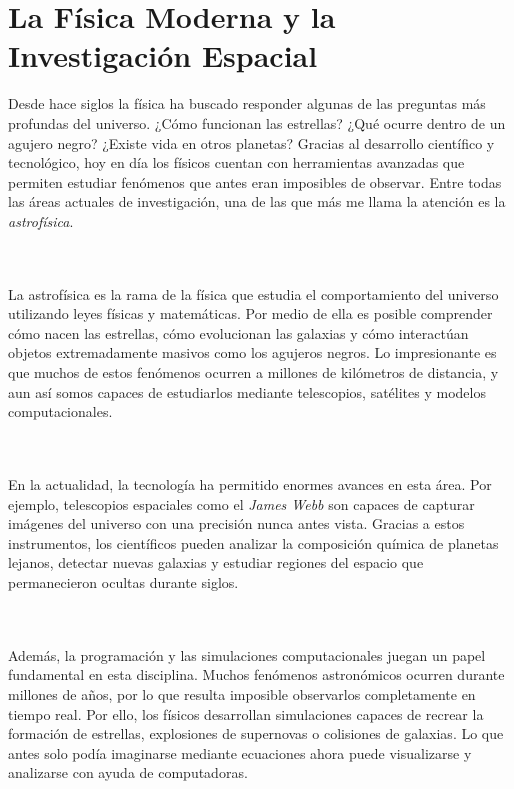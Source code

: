 \documentclass[12pt]{article}
\begin{document}
\section{La Física Moderna y la Investigación Espacial}

Desde hace siglos la física ha buscado responder algunas de las preguntas más profundas del universo. ¿Cómo funcionan las estrellas? ¿Qué ocurre dentro de un agujero negro? ¿Existe vida en otros planetas? Gracias al desarrollo científico y tecnológico, hoy en día los físicos cuentan con herramientas avanzadas que permiten estudiar fenómenos que antes eran imposibles de observar. Entre todas las áreas actuales de investigación, una de las que más me llama la atención es la \textit{astrofísica}.

\\ \\

La astrofísica es la rama de la física que estudia el comportamiento del universo utilizando leyes físicas y matemáticas. Por medio de ella es posible comprender cómo nacen las estrellas, cómo evolucionan las galaxias y cómo interactúan objetos extremadamente masivos como los agujeros negros. Lo impresionante es que muchos de estos fenómenos ocurren a millones de kilómetros de distancia, y aun así somos capaces de estudiarlos mediante telescopios, satélites y modelos computacionales.

\\ \\

En la actualidad, la tecnología ha permitido enormes avances en esta área. Por ejemplo, telescopios espaciales como el \textit{James Webb} son capaces de capturar imágenes del universo con una precisión nunca antes vista. Gracias a estos instrumentos, los científicos pueden analizar la composición química de planetas lejanos, detectar nuevas galaxias y estudiar regiones del espacio que permanecieron ocultas durante siglos.

\\ \\

Además, la programación y las simulaciones computacionales juegan un papel fundamental en esta disciplina. Muchos fenómenos astronómicos ocurren durante millones de años, por lo que resulta imposible observarlos completamente en tiempo real. Por ello, los físicos desarrollan simulaciones capaces de recrear la formación de estrellas, explosiones de supernovas o colisiones de galaxias. Lo que antes solo podía imaginarse mediante ecuaciones ahora puede visualizarse y analizarse con ayuda de computadoras.
\end{document}
